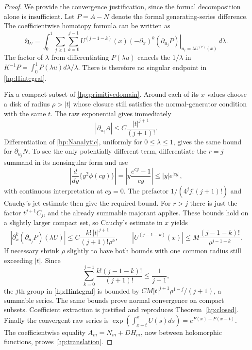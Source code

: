 \begin{proof}
We provide the convergence justification, since the formal
decomposition alone is insufficient. Let $P=A-N$ denote the
formal generating-series difference. The coefficientwise homotopy
formula can be written as
\begin{equation}\label{hp:Hintegral}
 \mathfrak H_U=\int_0^1\sum_{j\ge1}\sum_{k=0}^{j-1}
 U^{(j-1-k)}(x)(-\partial_x)^k
       \left.(\partial_{u_j}P)\right|_{u_r=\lambda U^{(r)}(x)}
                                      \,d\lambda.
\end{equation}
The factor of $\lambda$ from differentiating $P(\lambda u)$
cancels the $1/\lambda$ in $K^{-1}P=\int_0^1P(\lambda u)d\lambda/\lambda$.
There is therefore no singular endpoint in \eqref{hp:Hintegral}.

Fix a compact subset of \eqref{hp:primitivedomain}. Around each
of its $x$ values choose a disk of radius $\rho>|t|$ whose
closure still satisfies the normal-generator condition with
the same $t$. The raw exponential gives immediately
\[
 |\partial_{u_j}A|\le C\frac{|t|^{j+1}}{(j+1)!}.
\]
Differentiation of \eqref{hp:Nanalytic}, uniformly for
$0\le\lambda\le1$, gives the same bound for
$\partial_{u_j}N$. To see the only potentially different term,
differentiate the $r=j$ summand in its nonsingular form and use
\[
 \left|\frac{d}{dy}\{y^2\phi(cy)\}\right|
   =\left|y\frac{e^{cy}-1}{cy}\right|
   \le |y|e^{|cy|},
\]
with continuous interpretation at $cy=0$. The prefactor
$1/(4^jj!(j+1)!)$ and Cauchy's jet estimate then give
the required bound. For $r>j$ there is just the factor
$t^{j+1}C_j$, and the already summable majorant applies.
These bounds hold on a slightly larger compact set, so Cauchy's
estimate in $x$ yields
\[
 \left|\partial_x^k(\partial_{u_j}P)(\lambda U)\right|
 \le C\frac{k!\,|t|^{j+1}}{(j+1)!\rho^k},\qquad
 |U^{(j-1-k)}(x)|\le M\frac{(j-1-k)!}{\rho^{j-1-k}}.
\]
If necessary shrink $\rho$ slightly to have both bounds with
one common radius still exceeding $|t|$. Since
\[
 \sum_{k=0}^{j-1}\frac{k!(j-1-k)!}{(j+1)!}\le\frac1{j+1},
\]
the $j$th group in \eqref{hp:Hintegral} is bounded by
$CM|t|^{j+1}\rho^{1-j}/(j+1)$, a summable series.
The same bounds prove normal convergence on compact subsets.
Coefficient extraction is justified and reproduces
Theorem~\ref{hp:closed}. Finally the convergent raw series is
$\exp(\int_{x-t}^xU(s)ds)=e^{F(x)-F(x-t)}$.
The coefficientwise equality $A_m=N_m+DH_m$, now between
holomorphic functions, proves \eqref{hp:translation}.
\end{proof}

